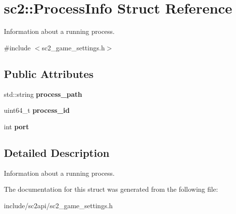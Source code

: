 \hypertarget{structsc2_1_1_process_info}{}\section{sc2\+:\+:Process\+Info Struct Reference}
\label{structsc2_1_1_process_info}


Information about a running process.  




{\ttfamily \#include $<$sc2\+\_\+game\+\_\+settings.\+h$>$}

\subsection*{Public Attributes}
\begin{DoxyCompactItemize}
\item 
\mbox{\label{structsc2_1_1_process_info_aa739a952c2f3bcfcdddb9229b92cbf1b}} 
std\+::string {\bfseries process\+\_\+path}
\item 
\mbox{\label{structsc2_1_1_process_info_afb992881f7429ad10addfaf55fa485b6}} 
uint64\+\_\+t {\bfseries process\+\_\+id}
\item 
\mbox{\label{structsc2_1_1_process_info_ad08a08caa07374a06da4e35efd4fb78e}} 
int {\bfseries port}
\end{DoxyCompactItemize}


\subsection{Detailed Description}
Information about a running process. 

The documentation for this struct was generated from the following file\+:\begin{DoxyCompactItemize}
\item 
include/sc2api/sc2\+\_\+game\+\_\+settings.\+h\end{DoxyCompactItemize}
